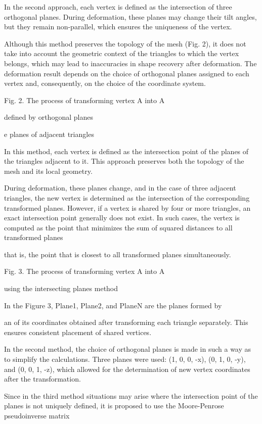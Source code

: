 \documentclass[12pt,a4paper]{article}
\begin{document}
In the second approach, each vertex is defined as the intersection of three orthogonal planes. During deformation, these planes may change their tilt angles, but they remain non-parallel, which ensures the uniqueness of the vertex.
\par
Although this method preserves the topology of the mesh (Fig. 2), it does not take into account the geometric context of the triangles to which the vertex belongs, which may lead to inaccuracies in shape recovery after deformation. The deformation result depends on the choice of orthogonal planes assigned to each vertex and, consequently, on the choice of the coordinate system.
\par
Fig. 2. The process of transforming vertex A into A
\par
defined by orthogonal planes
\par
e planes of adjacent triangles
\par
In this method, each vertex is defined as the intersection point of the planes of the triangles adjacent to it. This approach preserves both the topology of the mesh and its local geometry.
\par
During deformation, these planes change, and in the case of three adjacent triangles, the new vertex is determined as the intersection of the corresponding transformed planes. However, if a vertex is shared by four or more triangles, an exact intersection point generally does not exist. In such cases, the vertex is computed as the point that minimizes the sum of squared distances to all transformed planes
\par
that is, the point that is closest to all transformed planes simultaneously.
\par
Fig. 3. The process of transforming vertex A into A
\par
using the intersecting planes method
\par
In the Figure 3, Plane1, Plane2, and PlaneN are the planes formed by
\par
an of its coordinates obtained after transforming each triangle separately. This ensures consistent placement of shared vertices.
\par
In the second method, the choice of orthogonal planes is made in such a way as to simplify the calculations. Three planes were used: (1, 0, 0, -x), (0, 1, 0, -y), and (0, 0, 1, -z), which allowed for the determination of new vertex coordinates after the transformation.
\par
Since in the third method situations may arise where the intersection point of the planes is not uniquely defined, it is proposed to use the Moore-Penrose pseudoinverse matrix
\end{document}
